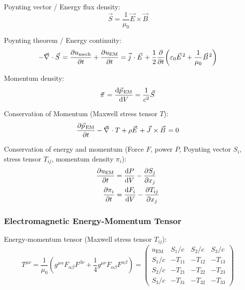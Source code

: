 			\noindent
			Poynting vector / Energy flux density:
			\begin{equation}
				\vec{S} = \frac{1}{\mu_0}\vec{E}\times\vec{B}
			\end{equation}

			\noindent
			Poynting theorem / Energy continuity:
			\begin{equation}
				-\Nabla\cdot\vec{S}
				= \pdv{u_{\mathrm{mech}}}{t} + \pdv{u_{\text{EM}}}{t}
				= \vec{j}\cdot\vec{E} + \frac{1}{2}\pdv{t}\qty(\varepsilon_0\vec{E}^2 + \frac{1}{\mu_0}\vec{B}^2)
			\end{equation}

			\noindent
			Momentum density:
			\begin{equation}
				\vec{\pi} = \dv{\vec{p}_{\text{EM}}}{V} = \frac{1}{c^2}\vec{S}
			\end{equation}

			\noindent
			Conservation of Momentum (Maxwell stress tensor $T$):
			\begin{equation}
				\pdv{\vec{p}_{\text{EM}}}{t} - \Nabla\cdot T + \rho \vec{E} + \vec{J}\times\vec{B} = 0
			\end{equation}

			\noindent
			Conservation of energy and momentum (Force $F$, power $P$, Poynting vector $S_i$, stress tensor $T_{ij}$, momentum density $\pi_i$):
			\begin{equation}
				\begin{aligned}
					\pdv{u_{\text{EM}}}{t} &= \dv{P}{V} - \pdv{S_j}{x_j} \\
					\pdv{\pi_i}{t} &=	\dv{F_i}{V} - \pdv{T_{ij}}{x_j}
				\end{aligned}
			\end{equation}

		\subsubsection{Electromagnetic Energy-Momentum Tensor}
			\noindent
			Energy-momentum tensor (Maxwell stress tensor $T_{ij}$):
			\begin{equation}
				T^{\mu\nu} = \frac{1}{\mu_0}\left(g^{\mu\alpha} F_{\alpha\beta} F^{\beta\nu} +\frac{1}{4}g^{\mu\nu} F_{\alpha\beta} F^{\alpha\beta} \right)
				= \left( \begin{matrix}
					u_{\text{EM}} & S_1/c & S_2/c & S_3/c \\
					S_1/c & -T_{11} & -T_{12} & -T_{13} \\
					S_2/c	& -T_{21} & -T_{22} & -T_{23} \\
					S_3/c & -T_{31} & -T_{32} & -T_{33}
				\end{matrix} \right)
			\end{equation}


